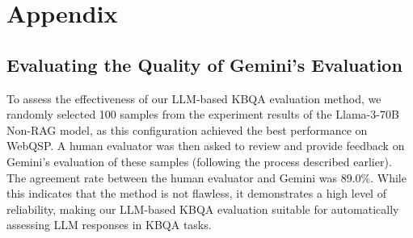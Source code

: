 \clearpage
\section{Appendix}
\label{sec:appendix}



\subsection{Evaluating the Quality of Gemini's Evaluation} 
\label{sec:eval_gemini}

To assess the effectiveness of our LLM-based KBQA evaluation method, we randomly selected 100 samples from the experiment results of the Llama-3-70B Non-RAG model, as this configuration achieved the best performance on WebQSP. A human evaluator was then asked to review and provide feedback on Gemini’s evaluation of these samples (following the process described earlier). The agreement rate between the human evaluator and Gemini was 89.0\%. While this indicates that the method is not flawless, it demonstrates a high level of reliability, making our LLM-based KBQA evaluation suitable for automatically assessing LLM responses in KBQA tasks.

